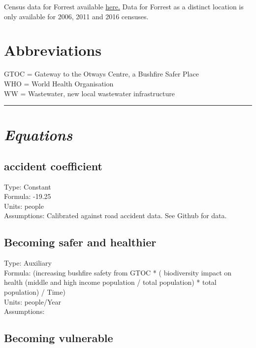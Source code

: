 \documentclass[
  11pt,
]{book}
\begin{document}
Census data for Forrest available \href{https://www.abs.gov.au/websitedbs/D3310114.nsf/Home/2016\%20QuickStats}{here.} Data for Forrest as a distinct location is only available for 2006, 2011 and 2016 censuses.

\hypertarget{abbreviations-1}{%
\section{Abbreviations}\label{abbreviations-1}}

GTOC = Gateway to the Otways Centre, a Bushfire Safer Place\\
WHO = World Health Organisation\\
WW = Wastewater, new local wastewater infrastructure

\begin{center}\rule{0.5\linewidth}{0.5pt}\end{center}

\hypertarget{equations-8}{%
\section{\texorpdfstring{\emph{Equations}}{Equations}}\label{equations-8}}

\hypertarget{accident-coefficient}{%
\subsection{accident coefficient}\label{accident-coefficient}}

Type: Constant\\
Formula: -19.25\\
Units: people\\
Assumptions: Calibrated against road accident data. See Github for data.

\hypertarget{becoming-safer-and-healthier}{%
\subsection{Becoming safer and healthier}\label{becoming-safer-and-healthier}}

Type: Auxiliary\\
Formula: (increasing bushfire safety from GTOC * ( biodiversity impact on health (middle and high income population / total population) * total population) / Time)\\
Units: people/Year\\
Assumptions:

\hypertarget{becoming-vulnerable}{%
\subsection{Becoming vulnerable}\label{becoming-vulnerable}}
\end{document}
